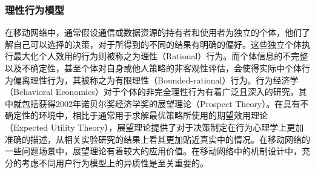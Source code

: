 \subsubsection{理性行为模型}
在移动网络中，通常假设通信或数据资源的持有者和使用者为独立的个体，他们了解自己可以选择的决策，对于所得到的不同的结果有明确的偏好。这些独立个体执行最大化个人效用的行为则被称之为理性（Rational）行为。而个体信息的不完整以及不确定性，甚至个体对自身或他人策略的非客观性评估，会使得实际中个体行为偏离理性行为，其被称之为有限理性（Bounded-rational）行为。行为经济学（Behavioral Economics）对于个体的非完全理性行为有着广泛且深入的研究，其中就包括获得2002年诺贝尔奖经济学奖的展望理论（Prospect Theory）\cite{Kahneman}。在具有不确定性的环境中，相比于通常用于求解最优策略所使用的期望效用理论（Expected Utility Theory），展望理论提供了对于决策制定在行为心理学上更加准确的描述，从相关实验研究的结果上看其更加贴近真实中的情况。在移动网络的一些问题场景中，展望理论有着较大的应用价值。在移动网络中的机制设计中，充分的考虑不同用户行为模型上的异质性是至关重要的。

